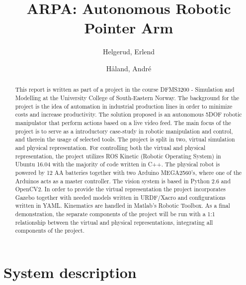 \documentclass[11pt,a4paper, titlepage]{report}
\title{ARPA: Autonomous Robotic Pointer Arm}
\author{Helgerud, Erlend \and Håland, André}
\begin{document}
	\setlength\parindent{0pt}
	\setlength\parskip{10pt}
	\headheight
	\setlength{15pt}{}
	\footskip
	\setlength{33pt}{}
	\setcounter{secnumdepth}{4}
	\maketitle
	
\begin{abstract}
This report is written as part of a project in the course DFMS3200 - Simulation and Modelling at the University College of South-Eastern Norway. The background for the project is the idea of automation in industrial production lines in order to minimize costs and increase productivity. The solution proposed is an autonomous 5DOF robotic manipulator that perform actions based on a live video feed. The main focus of the project is to serve as a introductory case-study in robotic manipulation and control, and therein the usage of selected tools. The project is split in two, virtual simulation and physical representation. For controlling both the virtual and physical representation, the project utilizes ROS Kinetic (Robotic Operating System) in Ubuntu 16.04 with the majority of code written in C++. The physical robot is powered by 12 AA batteries together with two Arduino MEGA2560's, where one of the Arduinos acts as a master controller. The vision system is based in Python 2.6 and OpenCV2. In order to provide the virtual representation the project incorporates Gazebo together with needed models written in URDF/Xacro and configurations written in YAML. Kinematics are handled in Matlab's Robotic Toolbox. As a final demonstration, the separate components of the project will be run with a 1:1 relationship between the virtual and physical representations, integrating all components of the project.
\end{abstract}
	
	\tableofcontents
	\newpage



	\section{System description}
	
\end{document}
